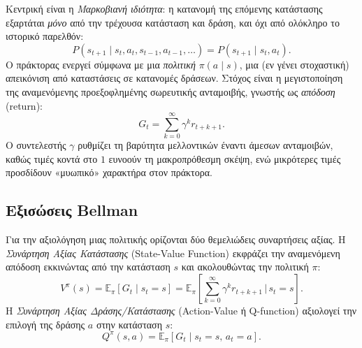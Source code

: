 Κεντρική είναι η \emph{Μαρκοβιανή ιδιότητα}: η κατανομή της επόμενης
κατάστασης εξαρτάται \emph{μόνο} από την τρέχουσα κατάσταση και δράση, και όχι
από ολόκληρο το ιστορικό παρελθόν:
\begin{equation}
    P(s_{t+1} \mid s_t, a_t, s_{t-1}, a_{t-1}, \dots)
    = P(s_{t+1} \mid s_t, a_t).
    \label{eq:markov}
\end{equation}
Ο πράκτορας ενεργεί σύμφωνα με μια \emph{πολιτική} $\pi(a \mid s)$, μια
(εν γένει στοχαστική) απεικόνιση από καταστάσεις σε κατανομές δράσεων. Στόχος
είναι η μεγιστοποίηση της αναμενόμενης προεξοφλημένης σωρευτικής ανταμοιβής,
γνωστής ως \emph{απόδοση} (return):
\begin{equation}
    G_t = \sum_{k=0}^{\infty} \gamma^{k} r_{t+k+1}.
    \label{eq:cum_return}
\end{equation}
Ο συντελεστής $\gamma$ ρυθμίζει τη βαρύτητα μελλοντικών έναντι άμεσων
ανταμοιβών, καθώς τιμές κοντά στο $1$ ευνοούν τη μακροπρόθεσμη σκέψη, ενώ μικρότερες
τιμές προσδίδουν «μυωπικό» χαρακτήρα στον πράκτορα.


\subsection{Εξισώσεις Bellman}
\label{subsec:bellman}

Για την αξιολόγηση μιας πολιτικής ορίζονται δύο θεμελιώδεις συναρτήσεις αξίας.
Η \emph{Συνάρτηση Αξίας Κατάστασης} (State-Value
Function) εκφράζει την αναμενόμενη απόδοση εκκινώντας από την κατάσταση $s$ και
ακολουθώντας την πολιτική $\pi$:
\begin{equation}
    V^{\pi}(s) = \mathbb{E}_{\pi}\!\left[ G_t \mid s_t = s \right]
    = \mathbb{E}_{\pi}\!\left[ \sum_{k=0}^{\infty}
        \gamma^{k} r_{t+k+1} \,\Big|\, s_t = s \right].
    \label{eq:vfunc}
\end{equation}
Η \emph{Συνάρτηση Αξίας Δράσης/Κατάστασης}
(Action-Value ή Q-function)
αξιολογεί την επιλογή της δράσης $a$ στην κατάσταση $s$:
\begin{equation}
    Q^{\pi}(s, a) = \mathbb{E}_{\pi}\!\left[ G_t \mid s_t = s,\, a_t = a \right].
    \label{eq:qfunc}
\end{equation}

